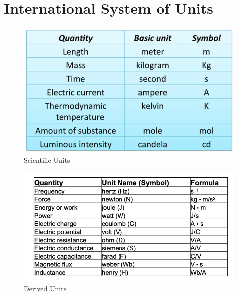 \documentclass[14pt]{memoir}
\begin{document}
\section{International System of Units}

\begin{figure}[h]
\begin{center}
\includegraphics[scale=0.30]{fig/tab01_01.png}
\caption{Scientific Units}
\label{fig:t01_01}
\end{center}
\end{figure}

\begin{figure}[h]
\begin{center}
\includegraphics[scale=0.40]{fig/tab01_02.png}
\caption{Derived Units}
\label{fig:t01_02}
\end{center}
\end{figure}
\end{document}
